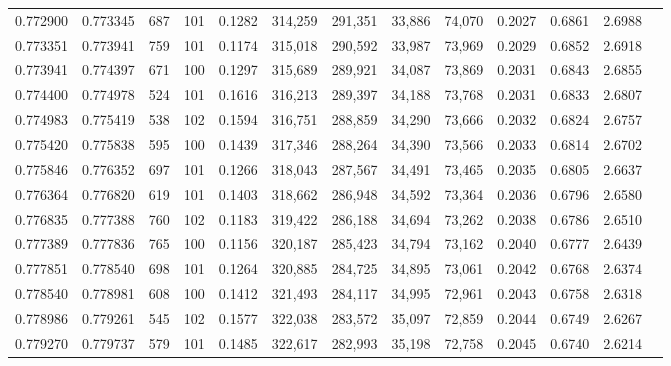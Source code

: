 \begin{tabular}{rrrrrrrrrrrrr}
0.772900 & 0.773345 &   687 & 101 &                                     0.1282 & 314,259 & 291,351 &  33,886 &  74,070 & 0.2027 & 0.6861 & 2.6988 \\
0.773351 & 0.773941 &   759 & 101 &                                     0.1174 & 315,018 & 290,592 &  33,987 &  73,969 & 0.2029 & 0.6852 & 2.6918 \\
0.773941 & 0.774397 &   671 & 100 &                                     0.1297 & 315,689 & 289,921 &  34,087 &  73,869 & 0.2031 & 0.6843 & 2.6855 \\
0.774400 & 0.774978 &   524 & 101 &                                     0.1616 & 316,213 & 289,397 &  34,188 &  73,768 & 0.2031 & 0.6833 & 2.6807 \\
0.774983 & 0.775419 &   538 & 102 &                                     0.1594 & 316,751 & 288,859 &  34,290 &  73,666 & 0.2032 & 0.6824 & 2.6757 \\
0.775420 & 0.775838 &   595 & 100 &                                     0.1439 & 317,346 & 288,264 &  34,390 &  73,566 & 0.2033 & 0.6814 & 2.6702 \\
0.775846 & 0.776352 &   697 & 101 &                                     0.1266 & 318,043 & 287,567 &  34,491 &  73,465 & 0.2035 & 0.6805 & 2.6637 \\
0.776364 & 0.776820 &   619 & 101 &                                     0.1403 & 318,662 & 286,948 &  34,592 &  73,364 & 0.2036 & 0.6796 & 2.6580 \\
0.776835 & 0.777388 &   760 & 102 &                                     0.1183 & 319,422 & 286,188 &  34,694 &  73,262 & 0.2038 & 0.6786 & 2.6510 \\
0.777389 & 0.777836 &   765 & 100 &                                     0.1156 & 320,187 & 285,423 &  34,794 &  73,162 & 0.2040 & 0.6777 & 2.6439 \\
0.777851 & 0.778540 &   698 & 101 &                                     0.1264 & 320,885 & 284,725 &  34,895 &  73,061 & 0.2042 & 0.6768 & 2.6374 \\
0.778540 & 0.778981 &   608 & 100 &                                     0.1412 & 321,493 & 284,117 &  34,995 &  72,961 & 0.2043 & 0.6758 & 2.6318 \\
0.778986 & 0.779261 &   545 & 102 &                                     0.1577 & 322,038 & 283,572 &  35,097 &  72,859 & 0.2044 & 0.6749 & 2.6267 \\
0.779270 & 0.779737 &   579 & 101 &                                     0.1485 & 322,617 & 282,993 &  35,198 &  72,758 & 0.2045 & 0.6740 & 2.6214 \\

\end{tabular}
